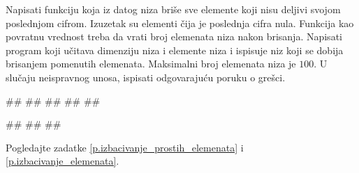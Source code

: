 \begin{Exercise}[label=v.brisanje_elemenata]
Napisati funkciju koja iz datog niza briše sve elemente koji nisu
deljivi svojom poslednjom cifrom. Izuzetak su elementi čija je poslednja
cifra nula. Funkcija kao povratnu vrednost treba
da vrati broj elemenata niza nakon brisanja. 
Napisati program koji učitava dimenziju niza i elemente niza i ispisuje niz koji se dobija  
brisanjem pomenutih elemenata. 
Maksimalni broj elemenata niza je $100$.
U slučaju neispravnog unosa, ispisati odgovarajuću poruku o grešci. 

\begin{miditest}
\begin{upotreba}{1}
#\naslovInt#
##
##
##
##
\end{upotreba}
\end{miditest}
\begin{miditest}
\begin{upotreba}{2}
#\naslovInt#
##
##
\end{upotreba}
\end{miditest}
\end{Exercise}

\ifresenja
\begin{Answer}[ref=v.brisanje_elemenata]
Pogledajte zadatke \ref{p.izbacivanje_prostih_elemenata} i \ref{p.izbacivanje_elemenata}.
\end{Answer}
\fi


